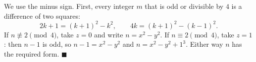 We use the minus sign. First, every integer $m$ that is odd or divisible by $4$ is a difference of two squares:
\[
2k+1=(k+1)^2-k^2,\qquad 4k=(k+1)^2-(k-1)^2 .
\]
If $n\not\equiv2\pmod4$, take $z=0$ and write $n=x^2-y^2$. If $n\equiv2\pmod4$, take $z=1$: then $n-1$ is odd, so $n-1=x^2-y^2$ and $n=x^2-y^2+1^3$. Either way $n$ has the required form. $\blacksquare$
